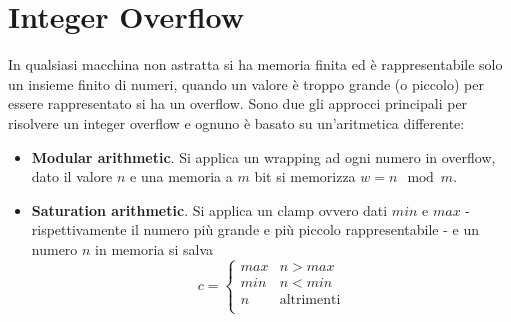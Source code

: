\documentclass[Lau,binding=0.6cm]{sapthesis}
\begin{document}

\section{Integer Overflow} \label{sec:integer_overflow}
In qualsiasi macchina non astratta si ha memoria finita ed è rappresentabile solo un insieme finito di numeri, quando un valore è troppo grande (o piccolo) per essere rappresentato si ha un overflow.
Sono due gli approcci principali per risolvere un integer overflow e ognuno è basato su un'aritmetica differente:
\begin{itemize}
    \item \textbf{Modular arithmetic}. Si applica un wrapping ad ogni numero in overflow, dato il valore $ n $ e una memoria a $ m $ bit si memorizza $ w = n \mod m $.
    \item \textbf{Saturation arithmetic}. Si applica un clamp ovvero dati $ min $ e $ max $ - rispettivamente il numero più grande e più piccolo rappresentabile - e un numero $ n $ in memoria si salva
    \begin{equation*}
        c = \begin{cases}
            max & n > max \\
            min & n < min \\
            n  & \text{altrimenti} \\
        \end{cases}
    \end{equation*}
\end{itemize}
\end{document}
